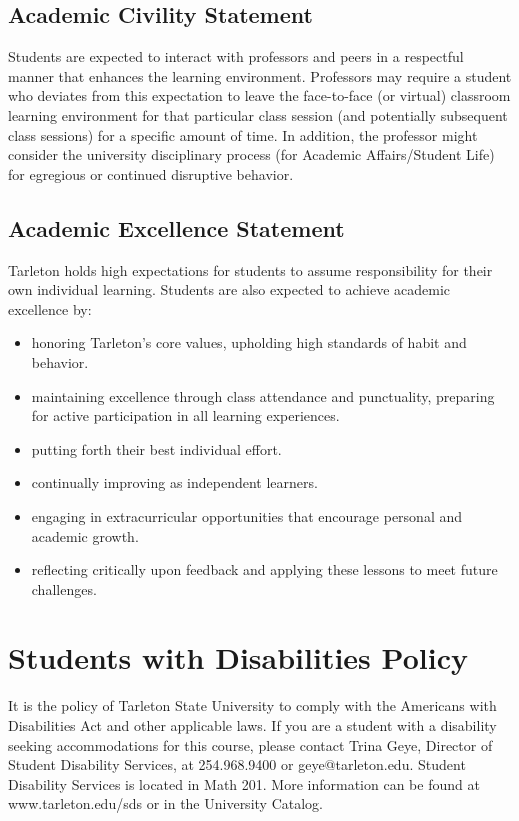 \documentclass[10pt]{article}
\begin{document}
\subsection*{Academic Civility Statement}
\label{sec-9-2}
Students are expected to interact with professors and peers in a respectful manner that enhances the learning environment. Professors may require a student who deviates from this expectation to leave the face-to-face (or virtual) classroom learning environment for that particular class session (and potentially subsequent class sessions) for a specific amount of time. In addition, the professor might consider the university disciplinary process (for Academic Affairs/Student Life) for egregious or continued disruptive behavior.

\subsection*{Academic Excellence Statement}
\label{sec-9-3}
Tarleton holds high expectations for students to assume responsibility for their own individual learning. Students are also expected to achieve academic excellence by:
\begin{itemize}
\item honoring Tarleton’s core values, upholding high standards of habit and behavior.
\item maintaining excellence through class attendance and punctuality, preparing for active participation in all learning experiences.
\item putting forth their best individual effort.
\item continually improving as independent learners.
\item engaging in extracurricular opportunities that encourage personal and academic growth.
\item reflecting critically upon feedback and applying these lessons to meet future challenges.
\end{itemize}

\section*{Students with Disabilities Policy}
\label{sec-10}

It is the policy of Tarleton State University to comply with the Americans
with Disabilities Act and other applicable laws. If you are a student with a
disability seeking accommodations for this course, please contact Trina
Geye, Director of Student Disability Services, at 254.968.9400 or
geye@tarleton.edu. Student Disability Services is
located in Math 201. More information can be found at www.tarleton.edu/sds or in the University Catalog.
\end{document}
